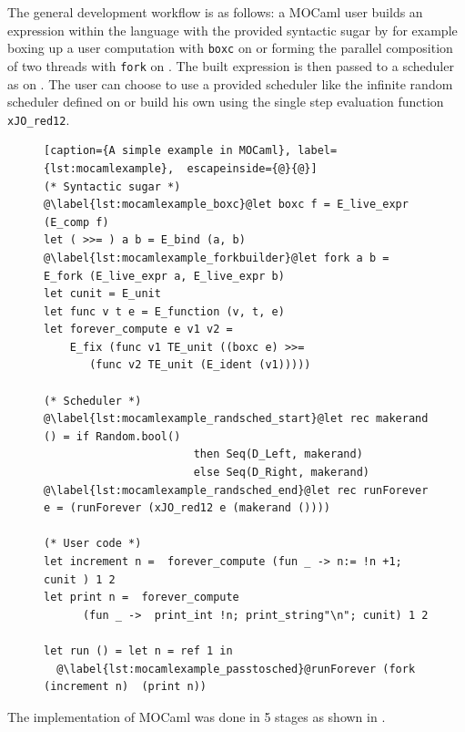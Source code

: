 \documentclass[12pt,twoside,notitlepage]{report}
\theoremstyle{plain}%
\theoremstyle{definition}
\theoremstyle{remark}
\begin{document}
The general development workflow is as follows: a MOCaml user builds an expression within the language with the provided syntactic sugar by for example boxing up a user computation with \lstinline|boxc| on  or forming the parallel composition of two threads with \lstinline|fork| on . The built expression is then passed to a scheduler as on . The user can choose to use a provided scheduler like the infinite random scheduler defined on  or build his own using the single step evaluation function \lstinline|xJO_red12|.
\begin{figure}[H]
\centering
\begin{lstlisting}[caption={A simple example in MOCaml}, label={lst:mocamlexample},  escapeinside={@}{@}]
(* Syntactic sugar *)
@\label{lst:mocamlexample_boxc}@let boxc f = E_live_expr (E_comp f)
let ( >>= ) a b = E_bind (a, b)
@\label{lst:mocamlexample_forkbuilder}@let fork a b = E_fork (E_live_expr a, E_live_expr b)
let cunit = E_unit
let func v t e = E_function (v, t, e)
let forever_compute e v1 v2 = 
    E_fix (func v1 TE_unit ((boxc e) >>= 
       (func v2 TE_unit (E_ident (v1)))))

(* Scheduler *)
@\label{lst:mocamlexample_randsched_start}@let rec makerand () = if Random.bool() 
                       then Seq(D_Left, makerand) 
                       else Seq(D_Right, makerand)
@\label{lst:mocamlexample_randsched_end}@let rec runForever e = (runForever (xJO_red12 e (makerand ())))

(* User code *)
let increment n =  forever_compute (fun _ -> n:= !n +1; cunit ) 1 2
let print n =  forever_compute 
      (fun _ ->  print_int !n; print_string"\n"; cunit) 1 2 

let run () = let n = ref 1 in
  @\label{lst:mocamlexample_passtosched}@runForever (fork (increment n)  (print n))
\end{lstlisting}
\end{figure}

The implementation of MOCaml was done in 5 stages as shown in . \label{sec:detailed_impl}
\end{document}
